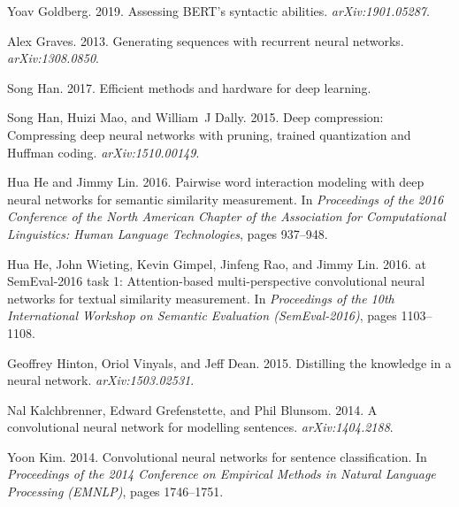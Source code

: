 \documentclass[11pt,a4paper]{article}
\begin{document}
\begin{thebibliography}{40}
Yoav Goldberg. 2019.
\newblock Assessing {BERT}'s syntactic abilities.
\newblock \emph{arXiv:1901.05287}.

Alex Graves. 2013.
\newblock Generating sequences with recurrent neural networks.
\newblock \emph{arXiv:1308.0850}.

Song Han. 2017.
\newblock Efficient methods and hardware for deep learning.

Song Han, Huizi Mao, and William~J Dally. 2015.
\newblock Deep compression: Compressing deep neural networks with pruning,
  trained quantization and {H}uffman coding.
\newblock \emph{arXiv:1510.00149}.

Hua He and Jimmy Lin. 2016.
\newblock Pairwise word interaction modeling with deep neural networks for
  semantic similarity measurement.
\newblock In \emph{Proceedings of the 2016 Conference of the North American
  Chapter of the Association for Computational Linguistics: Human Language
  Technologies}, pages 937--948.

Hua He, John Wieting, Kevin Gimpel, Jinfeng Rao, and Jimmy Lin. 2016.
 at {SemEval}-2016 task 1: Attention-based
  multi-perspective convolutional neural networks for textual similarity
  measurement.
\newblock In \emph{Proceedings of the 10th International Workshop on Semantic
  Evaluation (SemEval-2016)}, pages 1103--1108.

Geoffrey Hinton, Oriol Vinyals, and Jeff Dean. 2015.
\newblock Distilling the knowledge in a neural network.
\newblock \emph{arXiv:1503.02531}.

Nal Kalchbrenner, Edward Grefenstette, and Phil Blunsom. 2014.
\newblock A convolutional neural network for modelling sentences.
\newblock \emph{arXiv:1404.2188}.

Yoon Kim. 2014.
\newblock Convolutional neural networks for sentence classification.
\newblock In \emph{Proceedings of the 2014 Conference on Empirical Methods in
  Natural Language Processing (EMNLP)}, pages 1746--1751.


\end{thebibliography}
\end{document}
